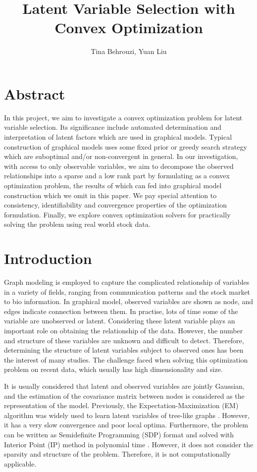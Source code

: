\documentclass[10pt,conference]{IEEEtran}
\begin{document}
\title{Latent Variable Selection with Convex Optimization}
\author{Tina Behrouzi, Yuan Liu}


\maketitle

\section{Abstract}
In this project, we aim to investigate a convex optimization problem for latent variable selection. Its significance include automated determination and interpretation of latent factors which are used in graphical models. Typical construction of graphical models uses some fixed prior or greedy search strategy which are suboptimal and/or non-convergent in general. In our investigation, with access to only observable variables, we aim to decompose the observed relationships into a sparse and a low rank part by formulating as a convex optimization problem, the results of which can fed into graphical model construction which we omit in this paper. We pay special attention to consistency, identifiability and convergence properties of the optimization formulation. Finally, we explore convex optimization solvers for practically solving the problem using real world stock data.
\section{Introduction}
Graph modeling is employed to capture the complicated relationship of variables in a variety of fields, ranging from communication patterns and the stock market to bio information. In graphical model, observed variables are shown as node, and edges indicate connection between them. In practise, lots of time some of the variable are unobserved or latent. Considering these latent variable plays an important role on obtaining the relationship of the data. However, the number and structure of these variables are unknown and difficult to detect. Therefore, determining the structure of latent variables subject to observed ones has been the interest of many studies. The challenge faced when solving this optimization problem on recent data, which usually has high dimensionality and size. 

It is usually considered that latent and observed variables are jointly Gaussian, and the estimation of the covariance matrix between nodes is considered as the representation of the model. Previously, the Expectation-Maximization (EM) algorithm was widely used to learn latent variables of tree-like graphs \cite{xu2017speeding}. However, it has a very slow convergence and poor local optima. Furthermore, the problem can be written as Semidefinite Programming (SDP) format and solved with Interior Point (IP) method in polynomial time \cite{ma2013alternating}. However, it does not consider the sparsity and structure of the problem. Therefore, it is not computationally applicable. 
\end{document}
